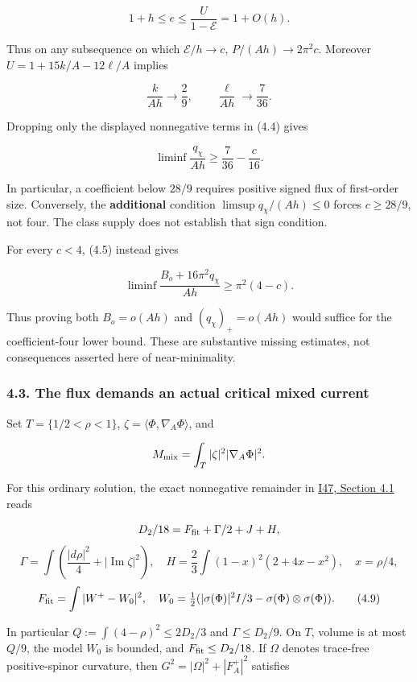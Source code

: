 \documentclass[
  10pt,
]{article}
\begin{document}
\[
 1+h\le e\le\frac{U}{1-\mathcal E}=1+O(h).
\]

Thus on any subsequence on which \(\mathcal E/h\to c\),
\(P/(Ah)\to2\pi^2c\). Moreover \(U=1+15k/A-12\ell/A\) implies

\[
 \frac{k}{Ah}\to\frac29,\qquad
 \frac{\ell}{Ah}\to\frac7{36}.
 \tag{4.6}
\]

Dropping only the displayed nonnegative terms in (4.4) gives

\[
 \boxed{\liminf\frac{q_\chi}{Ah}
                         \ge\frac7{36}-\frac c{16}.}
 \tag{4.7}
\]

In particular, a coefficient below \(28/9\) requires positive signed
flux of first-order size. Conversely, the \textbf{additional} condition
\(\limsup q_\chi/(Ah)\le0\) forces \(c\ge28/9\), not four. The class
supply does not establish that sign condition.

For every \(c<4\), (4.5) instead gives

\[
 \boxed{\liminf\frac{B_o+16\pi^2q_\chi}{Ah}
                                      \ge\pi^2(4-c).}
 \tag{4.8}
\]

Thus proving both \(B_o=o(Ah)\) and \((q_\chi)_+=o(Ah)\) would suffice
for the coefficient-four lower bound. These are substantive missing
estimates, not consequences asserted here of near-minimality.

\hypertarget{the-flux-demands-an-actual-critical-mixed-current}{%
\subsubsection{4.3. The flux demands an actual critical mixed
current}\label{the-flux-demands-an-actual-critical-mixed-current}}

Set \(T=\{1/2<\rho<1\}\), \(\zeta=\langle\Phi,\nabla_A\Phi\rangle\), and

\[
 M_{\rm mix}=\int_T|\zeta|^2|\nabla_A\Phi|^2.
\]

For this ordinary solution, the exact nonnegative remainder in
\href{20260927_full_core_cost_and_extremal_metrics.md}{I47, Section 4.1}
reads

\[
 D_2/18=F_{\rm fit}+\Gamma/2+J+H,
\] \[
 \Gamma=\int\left(\frac{|d\rho|^2}{4}+|\operatorname{Im}\zeta|^2\right),
 \quad H=\frac23\int(1-x)^2(2+4x-x^2),\quad x=\rho/4,
\] \[
 F_{\rm fit}=\int|W^+-W_0|^2,\quad
 W_0=\tfrac12(|\sigma(\Phi)|^2I/3-\sigma(\Phi)\otimes\sigma(\Phi)).
 \tag{4.9}
\]

In particular \(Q:=\int(4-\rho)^2\le2D_2/3\) and \(\Gamma\le D_2/9\). On
\(T\), volume is at most \(Q/9\), the model \(W_0\) is bounded, and
\(F_{\rm fit}\le D_2/18\). If \(\Omega\) denotes trace-free
positive-spinor curvature, then \(G^2=|\Omega|^2+|F_A^+|^2\) satisfies
\end{document}
